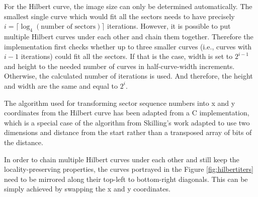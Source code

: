 \documentclass[
  digital, %
  color,   %
  oneside, %
  lof,     %
  nolot,     %
]{fithesis4}
\begin{document}
For the Hilbert curve, the image size can only be determined automatically.
The smallest single curve which would fit all the sectors needs to have precisely $i = \lceil\log_4(\text{number of sectors})\rceil$ iterations.
However, it is possible to put multiple Hilbert curves under each other and chain them together.
Therefore the implementation first checks whether up to three smaller curves (i.e., curves with $i - 1$ iterations) could fit all the sectors.
If that is the case, width is set to $2^{i - 1}$ and height to the needed number of curves in half-curve-width increments.
Otherwise, the calculated number of iterations is used.
And therefore, the height and width are the same and equal to $2^i$.


The algorithm used for transforming sector sequence numbers into x and y coordinates from the Hilbert curve has been adapted from a C implementation,\cite{wikihilbert} which is a special case of the algorithm from Skilling's work\cite{skilling04} adapted to use two dimensions and distance from the start rather than a transposed array of bits of the distance.

In order to chain multiple Hilbert curves under each other and still keep the locality-preserving properties, the curves portrayed in the Figure \ref{fig:hilbertiters} need to be mirrored along their top-left to bottom-right diagonals.
This can be simply achieved by swapping the x and y coordinates.
\end{document}

